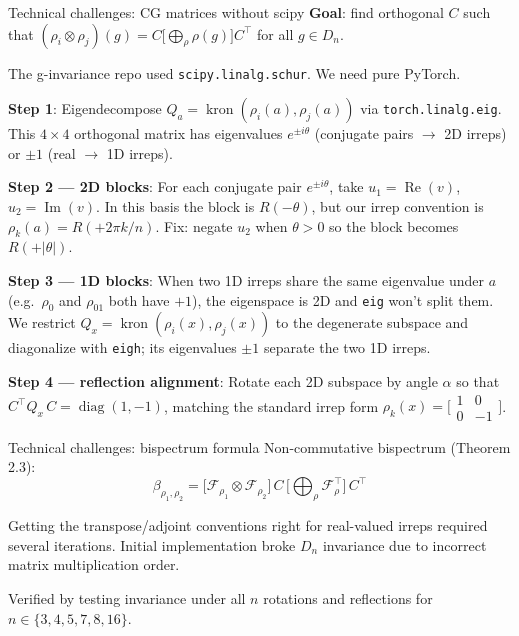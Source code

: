 \documentclass[aspectratio=169]{beamer}
\begin{document}
\begin{frame}{Technical challenges: CG matrices without scipy}
  \textbf{Goal}: find orthogonal $C$ such that
  $(\rho_i \otimes \rho_j)(g) = C \bigl[\bigoplus_\rho \rho(g)\bigr] C^\top$
  for all $g \in D_n$.

  \smallskip

  The g-invariance repo used \texttt{scipy.linalg.schur}. We need pure PyTorch.

  \smallskip

  \textbf{Step 1}: Eigendecompose $Q_a = \operatorname{kron}(\rho_i(a), \rho_j(a))$
  via \texttt{torch.linalg.eig}. This $4\times 4$ orthogonal matrix has
  eigenvalues $e^{\pm i\theta}$ (conjugate pairs $\to$ 2D irreps) or $\pm 1$
  (real $\to$ 1D irreps).

  \smallskip

  \textbf{Step 2 --- 2D blocks}: For each conjugate pair $e^{\pm i\theta}$,
  take $u_1 = \operatorname{Re}(v)$, $u_2 = \operatorname{Im}(v)$.
  In this basis the block is $R(-\theta)$, but our irrep convention is
  $\rho_k(a) = R(+2\pi k/n)$.
  Fix: negate $u_2$ when $\theta > 0$ so the block becomes $R(+|\theta|)$.

  \smallskip

  \textbf{Step 3 --- 1D blocks}: When two 1D irreps share the same eigenvalue
  under $a$ (e.g.\ $\rho_0$ and $\rho_{01}$ both have $+1$), the eigenspace is
  2D and \texttt{eig} won't split them. We restrict
  $Q_x = \operatorname{kron}(\rho_i(x), \rho_j(x))$ to the degenerate
  subspace and diagonalize with \texttt{eigh}; its eigenvalues $\pm 1$ separate
  the two 1D irreps.

  \smallskip

  \textbf{Step 4 --- reflection alignment}: Rotate each 2D subspace by angle
  $\alpha$ so that $C^\top Q_x\, C = \operatorname{diag}(1,-1)$, matching
  the standard irrep form $\rho_k(x) = \bigl[\begin{smallmatrix}1&0\\0&-1\end{smallmatrix}\bigr]$.
\end{frame}

\begin{frame}{Technical challenges: bispectrum formula}
  Non-commutative bispectrum (Theorem 2.3):
  \[
    \beta_{\rho_1,\rho_2} = \bigl[\mathcal{F}_{\rho_1} \otimes \mathcal{F}_{\rho_2}\bigr]
    \, C \, \bigl[\bigoplus_\rho \mathcal{F}_\rho^\top\bigr] \, C^\top
  \]

  \bigskip

  Getting the transpose/adjoint conventions right for real-valued irreps
  required several iterations. Initial implementation broke $D_n$ invariance
  due to incorrect matrix multiplication order.

  \bigskip

  Verified by testing invariance under all $n$ rotations and reflections
  for $n \in \{3, 4, 5, 7, 8, 16\}$.
\end{frame}
\end{document}
